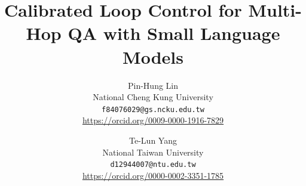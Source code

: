 \documentclass[10pt,twocolumn,letterpaper]{article}
\begin{document}
\title{Calibrated Loop Control for Multi-Hop QA with Small Language Models}

\author{Pin-Hung Lin\\
National Cheng Kung University\\
{\tt\small f84076029@gs.ncku.edu.tw}\\
{\small\hypersetup{urlcolor=black}\url{https://orcid.org/0009-0000-1916-7829}}
\and
Te-Lun Yang\\
National Taiwan University\\
{\tt\small d12944007@ntu.edu.tw}\\
{\small\hypersetup{urlcolor=black}\url{https://orcid.org/0000-0002-3351-1785}}}

\maketitle












\clearpage
\appendix

\end{document}
